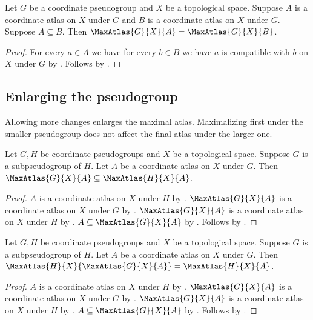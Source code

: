 \begin{corollary}\label{atlas_extension_same_max_atlas}
    Let $G$ be a coordinate pseudogroup and $X$ be a topological space.
    Suppose $A$ is a coordinate atlas on $X$ under $G$ and
        $B$ is a coordinate atlas on $X$ under $G$.
    Suppose $A\subseteq B$.
    Then $\MaxAtlas{G}{X}{A}=\MaxAtlas{G}{X}{B}$.
\end{corollary}
\begin{proof}
    For every $a\in A$ we have for every $b\in B$ we have
        $a$ is compatible with $b$ on $X$ under $G$ by
        .
    Follows by .
\end{proof}

\subsection{Enlarging the pseudogroup}

Allowing more changes enlarges the maximal atlas. Maximalizing first under
the smaller pseudogroup does not affect the final atlas under the larger one.

\begin{theorem}\label{subpseudogroup_max_atlas_inclusion}
    Let $G,H$ be coordinate pseudogroups and $X$ be a topological space.
    Suppose $G$ is a subpseudogroup of $H$.
    Let $A$ be a coordinate atlas on $X$ under $G$.
    Then $\MaxAtlas{G}{X}{A}\subseteq\MaxAtlas{H}{X}{A}$.
\end{theorem}
\begin{proof}
    $A$ is a coordinate atlas on $X$ under $H$ by .
    $\MaxAtlas{G}{X}{A}$ is a coordinate atlas on $X$ under $G$ by
        .
    $\MaxAtlas{G}{X}{A}$ is a coordinate atlas on $X$ under $H$ by .
    $A\subseteq\MaxAtlas{G}{X}{A}$ by .
    Follows by .
\end{proof}

\begin{theorem}\label{subpseudogroup_max_atlas_regeneration}
    Let $G,H$ be coordinate pseudogroups and $X$ be a topological space.
    Suppose $G$ is a subpseudogroup of $H$.
    Let $A$ be a coordinate atlas on $X$ under $G$.
    Then $\MaxAtlas{H}{X}{\MaxAtlas{G}{X}{A}}=\MaxAtlas{H}{X}{A}$.
\end{theorem}
\begin{proof}
    $A$ is a coordinate atlas on $X$ under $H$ by .
    $\MaxAtlas{G}{X}{A}$ is a coordinate atlas on $X$ under $G$ by
        .
    $\MaxAtlas{G}{X}{A}$ is a coordinate atlas on $X$ under $H$ by .
    $A\subseteq\MaxAtlas{G}{X}{A}$ by .
    Follows by .
\end{proof}

